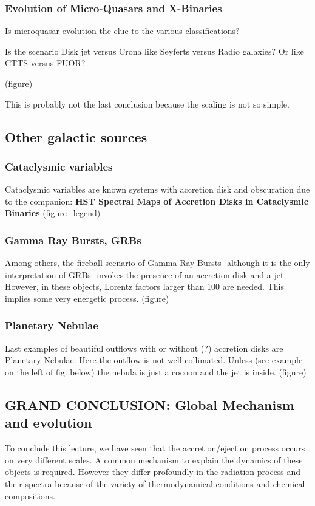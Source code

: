 \documentclass[10pt,a4paper,english,draft]{article}
\begin{document}
\subsubsection{Evolution of Micro-Quasars and X-Binaries}
Is microquasar evolution the clue to the various classifications?

Is the scenario Disk jet versus Crona like Seyferts versus Radio galaxies? Or like CTTS versus FUOR?

(figure)

This is probably not the last conclusion because the scaling is not so simple.

\subsection{Other galactic sources}
\subsubsection{Cataclysmic variables}
Cataclysmic variables are known systems with accretion disk and obscuration due to the companion: \textbf{HST Spectral Maps of Accretion Disks in Cataclysmic Binaries} (figure+legend)

\subsubsection{Gamma Ray Bursts, GRBs}
Among others, the fireball scenario of Gamma Ray Bursts -although it is the only interpretation of GRBs- invokes the presence of an accretion disk and a jet. However, in these objects, Lorentz factors larger than 100 are needed. This implies some very energetic process. (figure)

\subsubsection{Planetary Nebulae}
Last examples of beautiful outflows with or without (?) accretion disks are Planetary Nebulae. Here the outflow is not well collimated. Unless (see example on the left of fig. below) the nebula is just a cocoon and the jet is inside. (figure)

\subsection{GRAND CONCLUSION: Global Mechanism and evolution}

To conclude this lecture, we have seen that the accretion/ejection process occurs on very different scales. A common mechanism to explain the dynamics of these objects is required. However they differ profoundly in the radiation process and their spectra because of the variety of thermodynamical conditions and chemical compositions.
\end{document}

